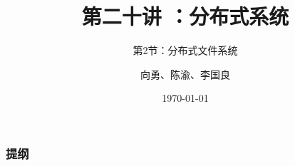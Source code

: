 


\title[第19讲]{第二十讲 ：分布式系统} %
\subtitle{第2节：分布式文件系统}
\author{向勇、陈渝、李国良} %
\date{\today} %


    
    \begin{frame}
        \titlepage %
    \end{frame}
    
    \begin{frame}
        \frametitle{提纲} %
        \tableofcontents %
        
        
    \end{frame}
